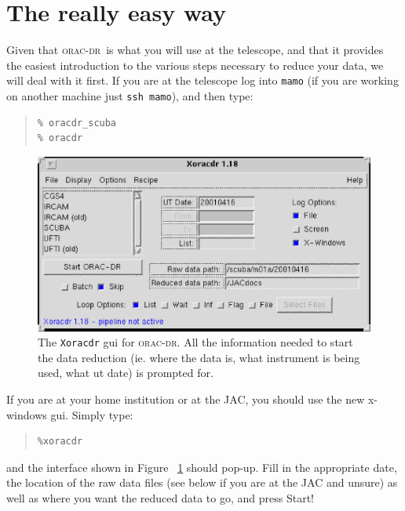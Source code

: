 \documentclass[twoside,11pt]{article}
\newenvironment{myquote}{\begin{quote}\begin{small}}{\end{small}\end{quote}}
\newcommand{\oracdr}{\xref{\textsc{orac-dr}}{sun231}{}}
\newcommand{\xref}[3]{#1}
\newcommand{\xlabel}[1]{}
\renewcommand{\_}{\texttt{\symbol{95}}}
\begin{document}
\section{\xlabel{The really easy way}The really easy way}

Given that \oracdr\ is what you will use at the telescope, and that it
provides the easiest introduction to the various steps necessary to
reduce your data, we will deal with it first. If you are at the
telescope log into \texttt{mamo} (if you are working on another machine just
\texttt{ssh mamo}), and then type:

\begin{myquote}
\begin{verbatim}
% oracdr_scuba
% oracdr
\end{verbatim}
\end{myquote}

\begin{figure}
\begin{center}
\includegraphics[width=5.5in]{sc11_fig1.eps}
\caption{The \texttt{Xoracdr} gui for \textsc{orac-dr}.
  All the information needed to start
  the data reduction (ie. where the data is, what instrument is being used,
  what ut date) is prompted for.}
\label{fig:xoracdr}
\end{center}
\end{figure}

If you are at your home institution or at the JAC, you should use the
new x-windows gui. Simply type:

\begin{myquote}
\begin{verbatim}
%xoracdr
\end{verbatim}
\end{myquote}

and the interface shown in Figure \ \ref{fig:xoracdr} should pop-up.
Fill in the appropriate date, the location of the raw data files (see
below if you are at the JAC and unsure) as well as where you want the
reduced data to go, and press Start!
\end{document}
